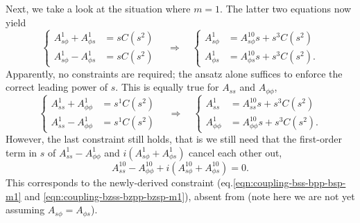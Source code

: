 \documentclass[a4paper, 11pt]{article}
\begin{document}
Next, we take a look at the situation where $m=1$. The latter two equations now yield
\[
\left\{\begin{aligned}
    A_{s\phi}^1 + A_{\phi s}^1 &= s C(s^2) \\ 
    A_{s\phi}^1 - A_{\phi s}^1 &= s C(s^2)
\end{aligned}\right. \quad \Longrightarrow\quad 
\left\{\begin{aligned}
    A_{s\phi}^1 &= A_{s\phi}^{10} s + s^{3} C(s^2) \\ 
    A_{\phi s}^1 &= A_{\phi s}^{10} s + s^{3} C(s^2). 
\end{aligned}\right.
\]
Apparently, no constraints are required; the ansatz alone suffices to enforce the correct leading power of $s$. This is equally true for $A_{ss}$ and $A_{\phi\phi}$,
\[
\left\{\begin{aligned}
    A_{ss}^1 + A_{\phi \phi}^1 &= s^{1} C(s^2) \\ 
    A_{ss}^1 - A_{\phi \phi}^1 &= s^{1} C(s^2)
\end{aligned}\right. \quad \Longrightarrow\quad 
\left\{\begin{aligned}
    A_{ss}^1 &= A_{ss}^{10} s + s^{3} C(s^2) \\ 
    A_{\phi \phi}^1 &= A_{\phi\phi}^{10} s + s^{3} C(s^2) .
\end{aligned}\right.
\]
However, the last constraint still holds, that is we still need that the first-order term in $s$ of $A_{ss}^1 - A_{\phi\phi}^1$ and $i \left(A_{s\phi}^1 + A_{\phi s}^1\right)$ cancel each other out,
\[
    A_{ss}^{10} - A_{\phi\phi}^{10} + i \left(A_{s\phi}^{10} + A_{\phi s}^{10}\right) = 0.
\]
This corresponds to the newly-derived constraint (eq.\ref{eqn:coupling-bss-bpp-bsp-m1} and \ref{eqn:coupling-bzss-bzpp-bzsp-m1}), absent from \textcite{holdenried-chernoff_long_2021} (note here we are not yet assuming $A_{s\phi} = A_{\phi s}$).
\end{document}
